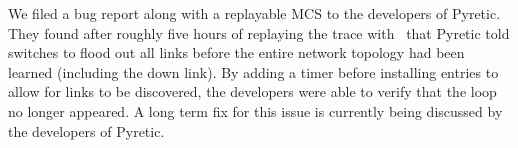 
We filed a bug report along with a replayable MCS
to the developers of Pyretic. They found after roughly
five hours of replaying the trace with \projectname~that Pyretic told switches to
flood out all links before the entire
network topology had been learned (including the down link). By adding a timer before installing
entries to allow for links to be discovered, the developers were able to verify
that the loop no longer appeared. A long term fix for this issue is currently being discussed by the developers of
Pyretic.\\[0.5ex]
